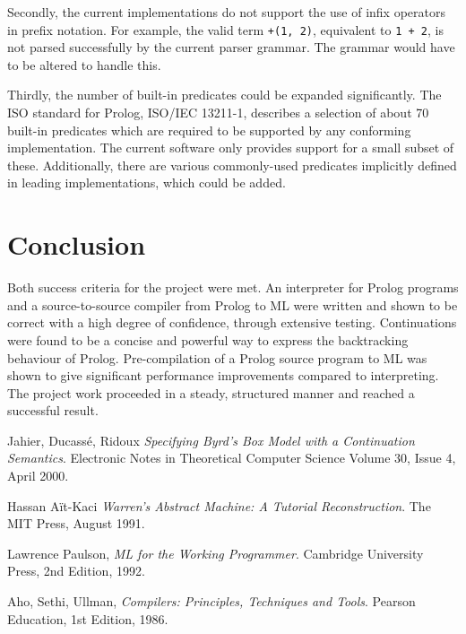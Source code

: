 \documentclass[12pt]{article}
\begin{document}
Secondly, the current implementations do not support the use of infix operators in prefix notation. 
For example, the valid term \verb|+(1, 2)|, equivalent to \verb|1 + 2|, is not parsed successfully by the current parser grammar. 
The grammar would have to be altered to handle this.

Thirdly, the number of built-in predicates could be expanded significantly. 
The ISO standard for Prolog, ISO/IEC 13211-1, describes a selection of about 70 built-in predicates which are required to be supported by any conforming implementation. 
The current software only provides support for a small subset of these.
Additionally, there are various commonly-used predicates implicitly defined in leading implementations, which could be added.

\newpage

\section{Conclusion}

Both success criteria for the project were met. An interpreter for Prolog programs and a source-to-source compiler from Prolog to ML were written and shown to be correct with a high degree of confidence, through extensive testing. Continuations were found to be a concise and powerful way to express the backtracking behaviour of Prolog. Pre-compilation of a Prolog source program to ML was shown to give significant performance improvements compared to interpreting. The project work proceeded in a steady, structured manner and reached a successful result. 

\begin{thebibliography}{9}

  Jahier, Ducass\'e, Ridoux
  \emph{Specifying Byrd's Box Model with a Continuation Semantics}.
  Electronic Notes in Theoretical Computer Science
  Volume 30, Issue 4,
  April 2000.

  Hassan A\"it-Kaci
  \emph{Warren's Abstract Machine: A Tutorial Reconstruction}.
  The MIT Press,
  August 1991.
  
  Lawrence Paulson,
  \emph{ML for the Working Programmer}.
  Cambridge University Press,
  2nd Edition,
  1992.
  
  Aho, Sethi, Ullman,
  \emph{Compilers: Principles, Techniques and Tools}.
  Pearson Education,
  1st Edition,
  1986.

\end{thebibliography}
\end{document}
